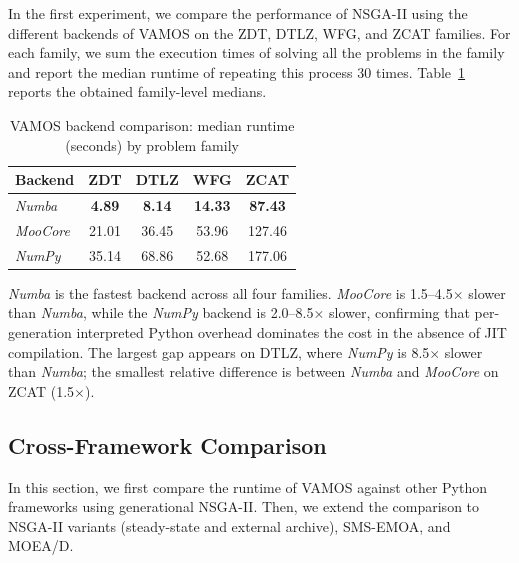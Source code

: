 \documentclass[journal]{IEEEtran}
\newcommand{\VAMOS}{VAMOS}
\begin{document}
In the first experiment, we compare the performance of NSGA-II using the different backends of \VAMOS{} on the ZDT, DTLZ, WFG, and ZCAT families. For each family, we sum the execution times of solving all the problems in the family and report the median runtime of repeating this process 30 times. Table~\ref{tab:backends} reports the obtained family-level medians.
\begin{table}[htbp]
\centering
\caption{VAMOS backend comparison: median runtime (seconds) by problem family}
\label{tab:backends}
\begin{tabular}{lcccc}
\toprule
\textbf{Backend} & \textbf{ZDT} & \textbf{DTLZ} & \textbf{WFG} & \textbf{ZCAT} \\
\midrule
\textit{Numba} & \textbf{4.89} & \textbf{8.14} & \textbf{14.33} & \textbf{87.43} \\
\textit{MooCore} & 21.01 & 36.45 & 53.96 & 127.46 \\
\textit{NumPy} & 35.14 & 68.86 & 52.68 & 177.06 \\
\bottomrule
\end{tabular}
\end{table}

\textit{Numba} is the fastest backend across all four families. \textit{MooCore} is 1.5--4.5$\times$ slower than \textit{Numba}, while the \textit{NumPy} backend is 2.0--8.5$\times$ slower, confirming that per-generation interpreted Python overhead dominates the cost in the absence of JIT compilation. The largest gap appears on DTLZ, where \textit{NumPy} is 8.5$\times$ slower than \textit{Numba}; the smallest relative difference is between \textit{Numba} and \textit{MooCore} on ZCAT (1.5$\times$).

\subsection{Cross-Framework Comparison}
In this section, we first compare the runtime of \VAMOS{} against other Python frameworks using generational NSGA-II. Then, we extend the comparison to NSGA-II variants (steady-state and external archive), SMS-EMOA, and MOEA/D.
\end{document}
